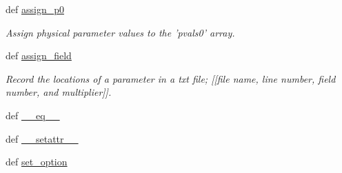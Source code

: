 \begin{DoxyCompactItemize}
def \hyperlink{classforcebalance_1_1forcefield_1_1FF_a3af07734a2378364ed533e2853ee6b82}{assign\-\_\-p0}
\begin{DoxyCompactList}\small\item\em Assign physical parameter values to the 'pvals0' array. \end{DoxyCompactList}\item 
def \hyperlink{classforcebalance_1_1forcefield_1_1FF_a2c9cda9adb5a6446fbccfa7b35f8dff5}{assign\-\_\-field}
\begin{DoxyCompactList}\small\item\em Record the locations of a parameter in a txt file; \mbox{[}\mbox{[}file name, line number, field number, and multiplier\mbox{]}\mbox{]}. \end{DoxyCompactList}\item 
def \hyperlink{classforcebalance_1_1forcefield_1_1FF_a8e7047c4b41a755c24996c9e1619df0b}{\-\_\-\-\_\-eq\-\_\-\-\_\-}
\item 
def \hyperlink{classforcebalance_1_1BaseClass_a0c851d413c3b2f30561b72a46771bcff}{\-\_\-\-\_\-setattr\-\_\-\-\_\-}
\item 
def \hyperlink{classforcebalance_1_1BaseClass_a73e9a37a7632e79eb99f49bd15aced45}{set\-\_\-option}
\end{DoxyCompactItemize}
